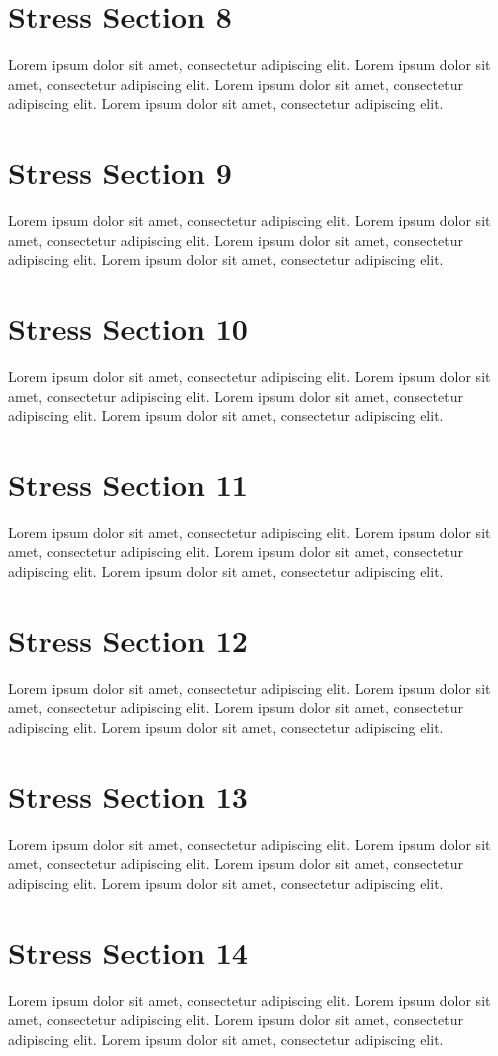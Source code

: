 \documentclass{article}
\begin{document}
\section{Stress Section 8}
Lorem ipsum dolor sit amet, consectetur adipiscing elit. Lorem ipsum dolor sit amet, consectetur adipiscing elit. Lorem ipsum dolor sit amet, consectetur adipiscing elit. Lorem ipsum dolor sit amet, consectetur adipiscing elit. \newpage
\section{Stress Section 9}
Lorem ipsum dolor sit amet, consectetur adipiscing elit. Lorem ipsum dolor sit amet, consectetur adipiscing elit. Lorem ipsum dolor sit amet, consectetur adipiscing elit. Lorem ipsum dolor sit amet, consectetur adipiscing elit. \newpage
\section{Stress Section 10}
Lorem ipsum dolor sit amet, consectetur adipiscing elit. Lorem ipsum dolor sit amet, consectetur adipiscing elit. Lorem ipsum dolor sit amet, consectetur adipiscing elit. Lorem ipsum dolor sit amet, consectetur adipiscing elit. \newpage
\section{Stress Section 11}
Lorem ipsum dolor sit amet, consectetur adipiscing elit. Lorem ipsum dolor sit amet, consectetur adipiscing elit. Lorem ipsum dolor sit amet, consectetur adipiscing elit. Lorem ipsum dolor sit amet, consectetur adipiscing elit. \newpage
\section{Stress Section 12}
Lorem ipsum dolor sit amet, consectetur adipiscing elit. Lorem ipsum dolor sit amet, consectetur adipiscing elit. Lorem ipsum dolor sit amet, consectetur adipiscing elit. Lorem ipsum dolor sit amet, consectetur adipiscing elit. \newpage
\section{Stress Section 13}
Lorem ipsum dolor sit amet, consectetur adipiscing elit. Lorem ipsum dolor sit amet, consectetur adipiscing elit. Lorem ipsum dolor sit amet, consectetur adipiscing elit. Lorem ipsum dolor sit amet, consectetur adipiscing elit. \newpage
\section{Stress Section 14}
Lorem ipsum dolor sit amet, consectetur adipiscing elit. Lorem ipsum dolor sit amet, consectetur adipiscing elit. Lorem ipsum dolor sit amet, consectetur adipiscing elit. Lorem ipsum dolor sit amet, consectetur adipiscing elit. \newpage
\end{document}
